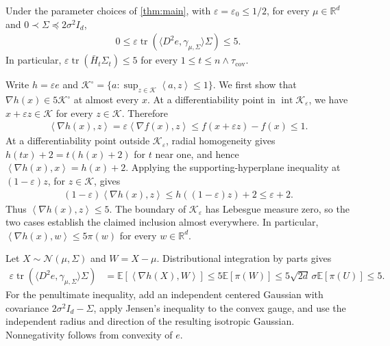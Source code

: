 \documentclass[12pt,cleveref]{jmlr}
\renewenvironment{proof}[1][\proofname]
{\par\noindent{\bfseries\upshape #1\ }}
{\jmlrQED}
\newcommand{\R}{\mathbb R}
\newcommand{\E}{\mathbb E}
\newcommand{\K}{\mathcal K}
\newcommand{\N}{\mathcal N}
\newcommand{\tr}{\operatorname{tr}}
\newcommand{\1}{\mathbf 1}
\newcommand{\eps}{\varepsilon}
\newcommand{\ip}[2]{\left\langle #1,#2\right\rangle}
\begin{document}
\begin{lemma}
    \label{lem:uniform-trace}
    Under the parameter choices of \cref{thm:main}, with
    $\eps=\eps_0\leq1/2$, for every $\mu\in\R^d$ and
    $0\prec\Sigma\preceq2\sigma^2I_d$,
    \begin{align}
        0\leq\eps\tr\left(
            \langle D^2e,\gamma_{\mu,\Sigma}\rangle\Sigma
        \right)\leq5.
    \end{align}
    In particular, $\eps\tr(\bar H_t\Sigma_t)\leq5$ for every
    $1\leq t\leq n\wedge\tau_{\mathrm{cov}}$.
\end{lemma}
\begin{proof}[Proof of \cref{lem:uniform-trace}]
    Write $h=\eps e$ and
    $\K^\circ=\{a:\sup_{z\in\K}\ip{a}{z}\leq1\}$.
    We first show that $\nabla h(x)\in5\K^\circ$ at almost every $x$.
    At a differentiability point in $\operatorname{int}\K_\eps$, we have
    $x+\eps z\in\K$ for every $z\in\K$. Therefore
    \begin{align}
        \ip{\nabla h(x)}{z}
        =\eps\ip{\nabla f(x)}{z}
        \leq f(x+\eps z)-f(x)\leq1.
    \end{align}
    At a differentiability point outside $\K_\eps$, radial homogeneity
    gives $h(tx)+2=t(h(x)+2)$ for $t$ near one, and hence
    $\ip{\nabla h(x)}{x}=h(x)+2$. Applying the supporting-hyperplane
    inequality at $(1-\eps)z$, for $z\in\K$, gives
    \begin{align}
        (1-\eps)\ip{\nabla h(x)}{z}
        \leq h((1-\eps)z)+2\leq\eps+2.
    \end{align}
    Thus $\ip{\nabla h(x)}{z}\leq5$. The boundary of $\K_\eps$ has
    Lebesgue measure zero, so the two cases establish the claimed
    inclusion almost everywhere. In particular,
    $\ip{\nabla h(x)}{w}\leq5\pi(w)$ for every $w\in\R^d$.

    Let $X\sim\N(\mu,\Sigma)$ and $W=X-\mu$. Distributional integration
    by parts gives
    \begin{align}
        \eps\tr\left(\langle D^2e,\gamma_{\mu,\Sigma}\rangle\Sigma\right)
        & =\E\left[\ip{\nabla h(X)}{W}\right]
        \leq5\E[\pi(W)]
        \leq5\sqrt{2d}\,\sigma\E[\pi(U)]
        \leq5.
    \end{align}
    For the penultimate inequality, add an independent centered Gaussian
    with covariance $2\sigma^2I_d-\Sigma$, apply Jensen's inequality to
    the convex gauge, and use the independent radius and direction of
    the resulting isotropic Gaussian. Nonnegativity follows from
    convexity of $e$.
\end{proof}
\end{document}
